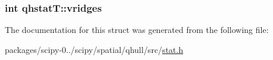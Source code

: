 \subsubsection[{vridges}]{\setlength{\rightskip}{0pt plus 5cm}int qhstat\+T\+::vridges}\label{structqhstatT_aeefa63828da865434ad1864a60e85786}


The documentation for this struct was generated from the following file\+:\begin{DoxyCompactItemize}
\item 
packages/scipy-\/0../scipy/spatial/qhull/src/\hyperlink{spatial_2qhull_2src_2stat_8h}{stat.\+h}\end{DoxyCompactItemize}
